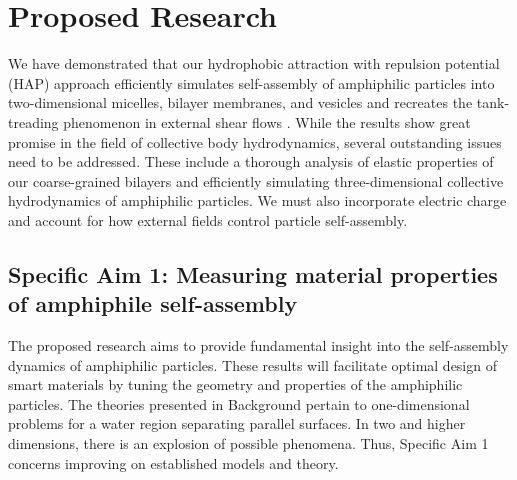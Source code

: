 \section{Proposed Research}
\label{sec:proposed-work}
We have demonstrated that our hydrophobic attraction with repulsion
potential (HAP) approach efficiently simulates self-assembly of
amphiphilic particles into two-dimensional micelles, bilayer membranes,
and vesicles \cite{Fu2018_SIAM} and recreates the tank-treading
phenomenon in external shear flows \cite{FuQuRyYo20}.
While the results show great promise in the field of collective body
hydrodynamics, several outstanding issues need to be addressed. These
include a thorough analysis of elastic properties of our coarse-grained
bilayers and efficiently simulating three-dimensional collective
hydrodynamics of amphiphilic particles.
We must also incorporate electric charge and account
for how external fields control particle self-assembly. 

\subsection{Specific Aim 1: Measuring material properties of amphiphile self-assembly}
\label{subsec:specific_aim_1}

The proposed research aims to provide fundamental insight into the
self-assembly dynamics of amphiphilic particles. These results will
facilitate optimal design of smart materials by tuning the geometry and
properties of the amphiphilic particles.
The theories presented in Background pertain to one-dimensional problems
for a water region separating parallel surfaces.
In two and higher dimensions, there 
is an explosion of possible phenomena.
Thus, Specific Aim 1 concerns  improving on established models and theory.

